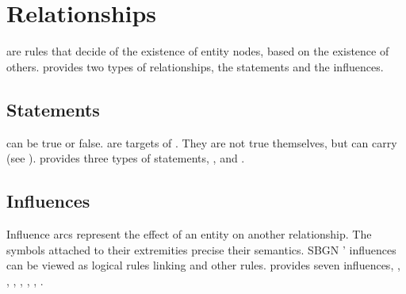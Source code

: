 
\section{Relationships}\label{sec:relationships}

 are rules that decide of the existence of entity nodes, based on the existence of others. 
\SBGNERLone{} provides two types of relationships, the statements and the influences.


\subsection{Statements}\label{sec:statements}

 can be true or false.  are targets of . They are not true themselves, but can  carry  (see ). \SBGNERLone{} provides three types of statements, ,  and .





\subsection{Influences}\label{sec:influences}

Influence arcs represent the effect of an entity  on another relationship. The symbols attached to their extremities precise their semantics. SBGN \ERs{}' influences can be viewed as logical rules linking  and other rules. \SBGNERLone{} provides seven influences, , , , , , , .











%

